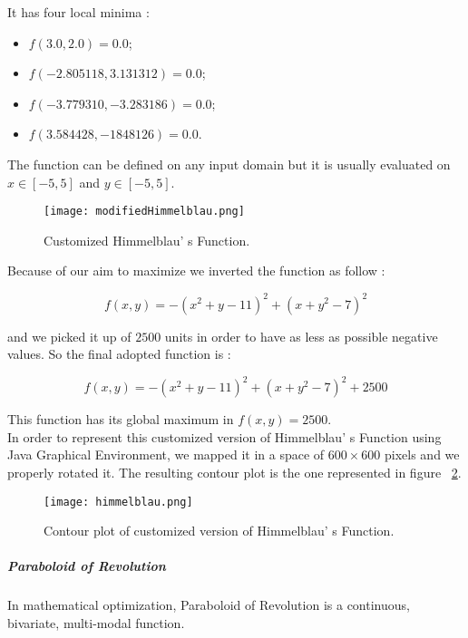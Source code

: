 It has four local minima :

\begin{itemize}
	\item $f(3.0, 2.0) = 0.0$;
	\item $f(-2.805118, 3.131312) = 0.0$;
	\item $f(-3.779310, -3.283186) = 0.0$;
	\item $f(3.584428, -1848126) = 0.0$.
\end{itemize}
	
The function can be defined on any input domain but it is usually evaluated on $x \in [-5, 5]$ and $y \in [-5, 5]$.

\begin{figure}[h!]
	\centering
	\texttt{[image: modifiedHimmelblau.png]}
	\caption{Customized Himmelblau' s Function.}
	\label{fig:CustomizedHimmelblauFunction}
\end{figure}

Because of our aim to maximize we inverted the function as follow :

\begin{equation}
f(x, y) = -(x^2 + y -11)^2 + (x + y^2 - 7)^2
\end{equation}

and we picked it up of $2500$ units in order to have as less as possible negative values. So the final adopted function is :
 
\begin{equation}
f(x, y) = -(x^2 + y -11)^2 + (x + y^2 - 7)^2 + 2500
\end{equation}

This function has its global maximum in $f(x, y) = 2500$. \\

In order to represent this customized version of Himmelblau' s Function using Java Graphical Environment, we mapped it in a space of $600 \times 600$ pixels and we properly rotated it. The resulting contour plot is the one represented in figure ~\ref{fig:ContourPlotCustomizedHimmelblauFunction}. \\

\begin{figure}[h!]
	\centering
	\texttt{[image: himmelblau.png]}
	\caption{Contour plot of customized version of Himmelblau' s Function.}
	\label{fig:ContourPlotCustomizedHimmelblauFunction}
\end{figure}
 
\subparagraph{Paraboloid of Revolution} In mathematical optimization, Paraboloid of Revolution is a continuous, bivariate, multi-modal function. \\

